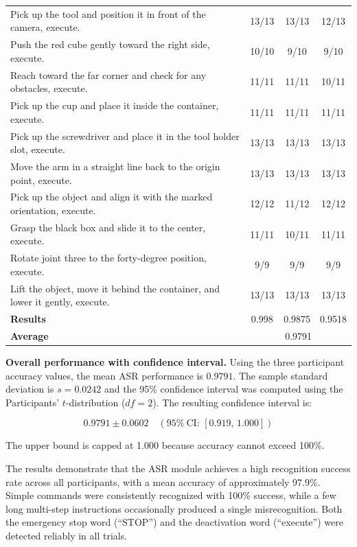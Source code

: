 \documentclass[12pt]{extarticle}
\begin{document}
\begin{table}[H]
{\begin{tabular}{lccc}
Pick up the tool and position it in front of the camera, execute. & 13/13 & 13/13 & 12/13 \\
Push the red cube gently toward the right side, execute. & 10/10 & 9/10 & 9/10 \\
Reach toward the far corner and check for any obstacles, execute. & 11/11 & 11/11 & 10/11 \\
Pick up the cup and place it inside the container, execute. & 11/11 & 11/11 & 11/11 \\
Pick up the screwdriver and place it in the tool holder slot, execute. & 13/13 & 13/13 & 13/13 \\
Move the arm in a straight line back to the origin point, execute. & 13/13 & 13/13 & 13/13 \\
Pick up the object and align it with the marked orientation, execute. & 12/12 & 11/12 & 12/12 \\
Grasp the black box and slide it to the center, execute. & 11/11 & 10/11 & 11/11 \\
Rotate joint three to the forty-degree position, execute. & 9/9 & 9/9 & 9/9 \\
Lift the object, move it behind the container, and lower it gently, execute. & 13/13 & 13/13 & 13/13 \\
\hline
\textbf{Results} & 0.998 & 0.9875 & 0.9518 \\
\textbf{Average} & \multicolumn{3}{c}{0.9791} \\
\hline
\end{tabular}%
}
\end{table}

\noindent \textbf{Overall performance with confidence interval.}  
Using the three participant accuracy values, the mean ASR performance is $0.9791$.  
The sample standard deviation is $s = 0.0242$ and the 95\% confidence interval was computed using the Participants' $t$-distribution ($df = 2$).  
The resulting confidence interval is:

\[
0.9791 \pm 0.0602 \quad (95\%~\text{CI: } [0.919,\,1.000])
\]

\noindent The upper bound is capped at 1.000 because accuracy cannot exceed 100\%.

The results demonstrate that the ASR module achieves a high recognition success rate across all participants, with a mean accuracy of approximately 97.9\%. Simple commands were consistently recognized with 100\% success, while a few long multi-step instructions occasionally produced a single misrecognition. Both the emergency stop word (``STOP'') and the deactivation word (``execute'') were detected reliably in all trials.
\end{document}
